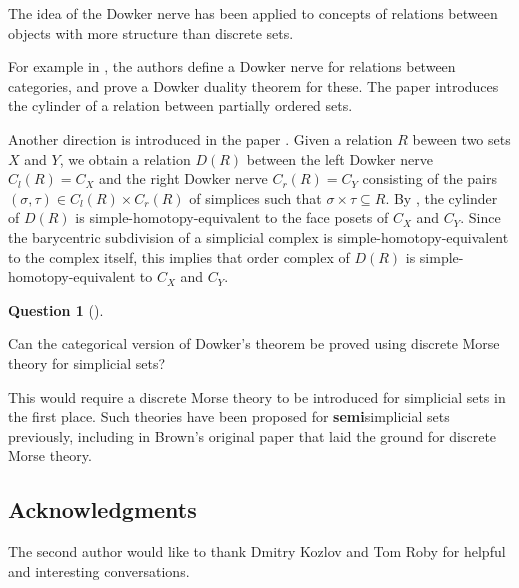 \documentclass[numbers=enddot,12pt,final,onecolumn,notitlepage]{scrartcl}%
\theoremstyle{definition}
\newtheorem{quest}[theo]{Question}
\newenvironment{question}[1][]
{\begin{quest}[#1]\begin{leftbar}}
{\end{leftbar}\end{quest}}
\newenvironment{question}[1][Question]{\noindent\textbf{#1.} }{\ \rule{0.5em}{0.5em}}
\begin{document}
The idea of the Dowker nerve has been applied to concepts of relations between 
objects with more structure than discrete sets. 

For example in \cite{BrFoSa23}, the authors define a Dowker nerve for relations 
between categories, and prove a Dowker duality theorem for these.
The paper \cite{FerMin20} introduces the cylinder of a relation between partially
ordered sets.

Another direction is introduced in the paper \cite{FerMin20}.
Given a relation $R$ beween two sets $X$ and $Y$, we obtain a relation $D(R)$
between the left Dowker nerve $C_l(R) = C_X$ and the right Dowker nerve $C_r(R) = C_Y$
consisting of the pairs $(\sigma, \tau) \in C_l(R) \times C_r(R)$ of simplices such that
$\sigma \times \tau \subseteq R$. By \cite[Theorem 2.6]{FerMin20}, the cylinder
of $D(R)$ is simple-homotopy-equivalent to the face posets of $C_X$ and $C_Y$.
Since the barycentric subdivision of a simplicial complex is simple-homotopy-equivalent
to the complex itself, this implies that order complex of $D(R)$ is simple-homotopy-equivalent
to $C_X$ and $C_Y$.



\begin{question}
Can the categorical version of Dowker's theorem \cite{BrFoSa23}  be proved
using discrete Morse theory for simplicial sets?
\end{question}

This would require a discrete Morse theory to be introduced for simplicial sets
in the first place. Such theories have been proposed for \textbf{semi}simplicial sets
previously, including in Brown's original paper \cite{Brown92} that laid the
ground for discrete Morse theory.

\subsection*{Acknowledgments}

The second author would like to thank Dmitry Kozlov and Tom Roby for
helpful and interesting conversations.

\bigskip
\end{document}
